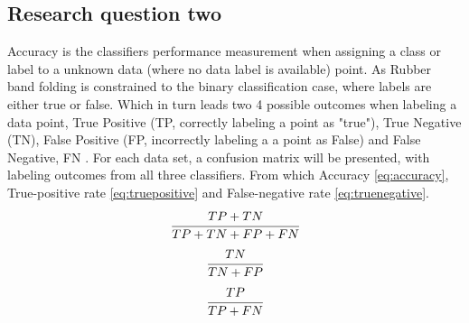 \documentclass[a4paper,twoside]{bth}
\begin{document}
\subsection{Research question two}


\par Accuracy is the classifiers performance measurement when assigning a class or label to a unknown data (where no data label is available) point. As Rubber band folding is constrained to the binary classification case, where labels are either true or false. Which in turn leads two 4 possible outcomes when labeling a data point, True Positive (TP, correctly labeling a point as "true"), True Negative (TN), False Positive (FP, incorrectly labeling a a point as False) and False Negative, FN \cite{Japkowicz:2011}. For each data set, a confusion matrix will be presented, with labeling outcomes from all three classifiers. From which Accuracy \ref{eq:accuracy}, True-positive rate \ref{eq:truepositive} and False-negative rate \ref{eq:truenegative}.
\begin{equation}\label{eq:accuracy}
\begin{aligned}
     \cfrac{TP + TN}{TP + TN + FP + FN}
\end{aligned}
\end{equation} 
\begin{equation}\label{eq:truenegative}
\begin{aligned}
     \cfrac{TN}{TN + FP}
\end{aligned}
\end{equation} 
\begin{equation}\label{eq:truepositive}
\begin{aligned}
     \cfrac{TP}{TP + FN}
\end{aligned}
\end{equation} 
\end{document}
